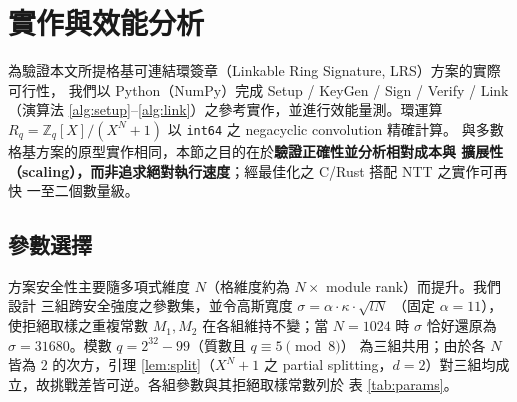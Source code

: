 
\section{實作與效能分析}
\label{sec:impl}

為驗證本文所提格基可連結環簽章（Linkable Ring Signature, LRS）方案的實際可行性，
我們以 Python（NumPy）完成 Setup / KeyGen / Sign / Verify / Link（演算法
\ref{alg:setup}--\ref{alg:link}）之參考實作，並進行效能量測。環運算
$R_q = \mathbb{Z}_q[X]/(X^N+1)$ 以 \texttt{int64} 之 negacyclic convolution 精確計算。
與多數格基方案的原型實作相同，本節之目的在於\textbf{驗證正確性並分析相對成本與
擴展性（scaling），而非追求絕對執行速度}；經最佳化之 C/Rust 搭配 NTT 之實作可再快
一至二個數量級。

\subsection{參數選擇}
\label{subsec:impl-params}

方案安全性主要隨多項式維度 $N$（格維度約為 $N\times$ module rank）而提升。我們設計
三組跨安全強度之參數集，並令高斯寬度 $\sigma = \alpha\cdot\kappa\cdot\sqrt{lN}$
（固定 $\alpha=11$），使拒絕取樣之重複常數 $M_1, M_2$ 在各組維持不變；當 $N=1024$
時 $\sigma$ 恰好還原為 $\sigma=31680$。模數 $q=2^{32}-99$（質數且 $q\equiv 5 \pmod 8$）
為三組共用；由於各 $N$ 皆為 $2$ 的次方，引理 \ref{lem:split}（$X^N+1$ 之 partial
splitting，$d=2$）對三組均成立，故挑戰差皆可逆。各組參數與其拒絕取樣常數列於
表 \ref{tab:params}。

